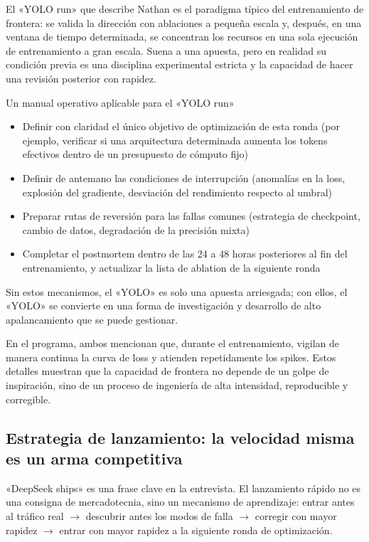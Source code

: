 \documentclass[a4paper]{article}
\begin{document}
El «YOLO run» que describe Nathan es el paradigma típico del entrenamiento de frontera: se valida la dirección con ablaciones a pequeña escala y, después, en una ventana de tiempo determinada, se concentran los recursos en una sola ejecución de entrenamiento a gran escala. Suena a una apuesta, pero en realidad su condición previa es una disciplina experimental estricta y la capacidad de hacer una revisión posterior con rapidez.

\begin{knowledgebox}{Un manual operativo aplicable para el «YOLO run»}
\begin{itemize}
    \item Definir con claridad el único objetivo de optimización de esta ronda (por ejemplo, verificar si una arquitectura determinada aumenta los tokens efectivos dentro de un presupuesto de cómputo fijo)
    \item Definir de antemano las condiciones de interrupción (anomalías en la loss, explosión del gradiente, desviación del rendimiento respecto al umbral)
    \item Preparar rutas de reversión para las fallas comunes (estrategia de checkpoint, cambio de datos, degradación de la precisión mixta)
    \item Completar el postmortem dentro de las 24 a 48 horas posteriores al fin del entrenamiento, y actualizar la lista de ablation de la siguiente ronda
\end{itemize}

Sin estos mecanismos, el «YOLO» es solo una apuesta arriesgada; con ellos, el «YOLO» se convierte en una forma de investigación y desarrollo de alto apalancamiento que se puede gestionar.
\end{knowledgebox}

En el programa, ambos mencionan que, durante el entrenamiento, vigilan de manera continua la curva de loss y atienden repetidamente los spikes. Estos detalles muestran que la capacidad de frontera no depende de un golpe de inspiración, sino de un proceso de ingeniería de alta intensidad, reproducible y corregible.

\subsection{Estrategia de lanzamiento: la velocidad misma es un arma competitiva}

«DeepSeek ships» es una frase clave en la entrevista. El lanzamiento rápido no es una consigna de mercadotecnia, sino un mecanismo de aprendizaje: entrar antes al tráfico real $\to$ descubrir antes los modos de falla $\to$ corregir con mayor rapidez $\to$ entrar con mayor rapidez a la siguiente ronda de optimización.
\end{document}
